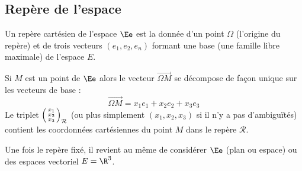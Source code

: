 \subsection{Repère de l'espace} 

\begin{definition}
Un repère cartésien de l'espace $\Ee$ est la donnée d'un point $\Omega$ (l'origine du repère) et de trois vecteurs $(e_1,e_2,e_n)$ formant une base (\ie une famille libre maximale) de l'espace $E$.
\end{definition}

\begin{definition}
	Si $M$ est un point de $\Ee$ alors le vecteur $\overrightarrow{\Omega M}$ se décompose de façon unique sur les vecteurs de base :
	\[
		\overrightarrow{\Omega M} = x_1 e_1 + x_2 e_2 + x_3 e_3 
	\]
	Le triplet $\begin{psmallmatrix}x_1 \\ x_2 \\ x_3\end{psmallmatrix}_{\mathcal R}$ (ou plus simplement $(x_1,x_2,x_3)$ si il n'y a pas d'ambiguïtés) contient les coordonnées cartésiennes du point $M$ dans le repère $\mathcal R$.
\end{definition}

\begin{remark}
	Une fois le repère fixé, il revient au même de considérer $\Ee$ (plan ou espace) ou des espaces vectoriel $E=\R^3$. %
\end{remark}

